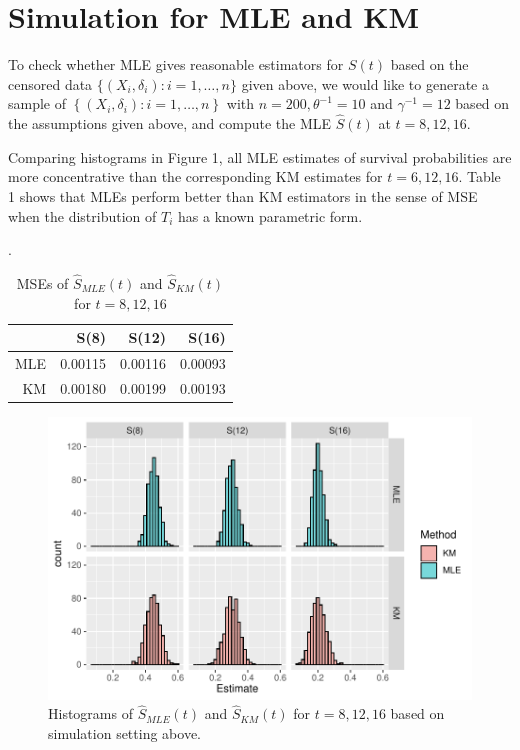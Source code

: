 \documentclass[11pt]{article}
\newcommand{\hS}{\hat{S}}
\begin{document}
\section{Simulation for MLE and KM}

To check whether MLE gives reasonable estimators for $S(t)$ based on the
censored data $\{(X_i,\delta_i): i=1,\dots,n \}$ given above, we would
like to generate a sample of $\left\{(X_i,\delta_i): i=1,\dots,n \right\}$ with
$n=200, \theta^{-1}=10$ and $\gamma^{-1}=12$ based on the assumptions given
above, and compute the MLE $\hS(t)$ at $t=8,12,16$.

Comparing histograms in Figure 1, all MLE estimates of survival probabilities are more
concentrative than the corresponding KM estimates for $t=6,12,16$. Table 1 shows that MLEs perform better than KM estimators in the sense of MSE when the distribution
of $T_i$ has a known parametric form.

\begin{table}[H]
  \label{tab:mse}
  \caption{MSEs of $\hS_{MLE}(t)$ and $\hS_{KM}(t)$ for $t=8,12,16$}.
\centering
\begin{tabular}{rrrr}
  \hline
  \hline
 & S(8) & S(12) & S(16) \\ 
  \hline
MLE & 0.00115 & 0.00116 & 0.00093 \\ 
  KM & 0.00180 & 0.00199 & 0.00193 \\ 
   \hline
\end{tabular}
\end{table}
\begin{figure}[H]
  \label{fig:hist}
  \centering
  \includegraphics[width=\textwidth]{Ass3Hist.pdf}
  \caption{Histograms of $\hS_{MLE}(t)$ and $\hS_{KM}(t)$ for $t=8,12,16$ based
  on simulation setting above.}
\end{figure}
\end{document}
